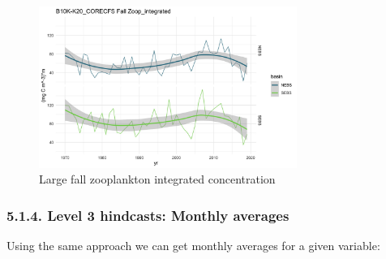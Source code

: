 \documentclass[
]{article}
\begin{document}
\begin{figure}
\centering
\includegraphics[width=0.75\textwidth,height=\textheight]{Figs/Hind_Fall_large_Zoop.jpg}
\caption{Large fall zooplankton integrated concentration}
\end{figure}

\hypertarget{level-3-hindcasts-monthly-averages}{%
\subsubsection{5.1.4. Level 3 hindcasts: Monthly
averages}\label{level-3-hindcasts-monthly-averages}}

Using the same approach we can get monthly averages for a given
variable:
\end{document}
